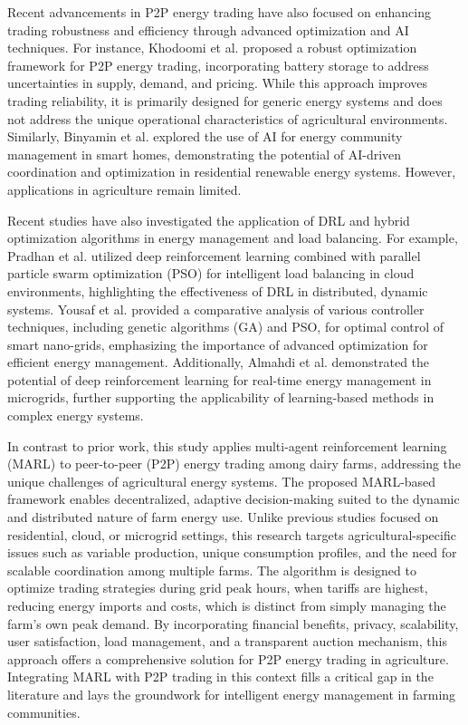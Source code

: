 \documentclass[preprint,12pt]{elsarticle}
\begin{document}
Recent advancements in P2P energy trading have also focused on enhancing trading robustness and efficiency through advanced optimization and AI techniques. For instance, Khodoomi et al. \cite{khodoomi2023robust} proposed a robust optimization framework for P2P energy trading, incorporating battery storage to address uncertainties in supply, demand, and pricing. While this approach improves trading reliability, it is primarily designed for generic energy systems and does not address the unique operational characteristics of agricultural environments. Similarly, Binyamin et al. \cite{binyamin2024artificial} explored the use of AI for energy community management in smart homes, demonstrating the potential of AI-driven coordination and optimization in residential renewable energy systems. However, applications in agriculture remain limited.

Recent studies have also investigated the application of DRL and hybrid optimization algorithms in energy management and load balancing. For example, Pradhan et al. \cite{pradhan2022intelligent} utilized deep reinforcement learning combined with parallel particle swarm optimization (PSO) for intelligent load balancing in cloud environments, highlighting the effectiveness of DRL in distributed, dynamic systems. Yousaf et al. \cite{yousaf2020comparative} provided a comparative analysis of various controller techniques, including genetic algorithms (GA) and PSO, for optimal control of smart nano-grids, emphasizing the importance of advanced optimization for efficient energy management. Additionally, Almahdi et al. \cite{almahdi2019constrained} demonstrated the potential of deep reinforcement learning for real-time energy management in microgrids, further supporting the applicability of learning-based methods in complex energy systems.

In contrast to prior work, this study applies multi-agent reinforcement learning (MARL) to peer-to-peer (P2P) energy trading among dairy farms, addressing the unique challenges of agricultural energy systems. The proposed MARL-based framework enables decentralized, adaptive decision-making suited to the dynamic and distributed nature of farm energy use. Unlike previous studies focused on residential, cloud, or microgrid settings, this research targets agricultural-specific issues such as variable production, unique consumption profiles, and the need for scalable coordination among multiple farms. The algorithm is designed to optimize trading strategies during grid peak hours, when tariffs are highest, reducing energy imports and costs, which is distinct from simply managing the farm’s own peak demand. By incorporating financial benefits, privacy, scalability, user satisfaction, load management, and a transparent auction mechanism, this approach offers a comprehensive solution for P2P energy trading in agriculture. Integrating MARL with P2P trading in this context fills a critical gap in the literature and lays the groundwork for intelligent energy management in farming communities.
\end{document}
